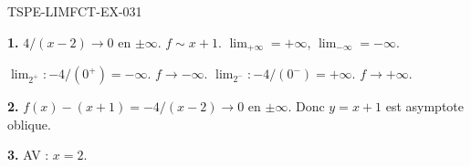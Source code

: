 \begin{corrige}{TSPE-LIMFCT-EX-031}

\textbf{1.} $4/(x-2) \to 0$ en $\pm\infty$. $f \sim x+1$. $\lim_{+\infty} = +\infty$, $\lim_{-\infty} = -\infty$.

$\lim_{2^+} : -4/(0^+) = -\infty$. $f \to -\infty$. $\lim_{2^-} : -4/(0^-) = +\infty$. $f \to +\infty$.

\textbf{2.} $f(x) - (x+1) = -4/(x-2) \to 0$ en $\pm\infty$. Donc $y = x+1$ est asymptote oblique.

\textbf{3.} AV : $x = 2$.

\end{corrige}
